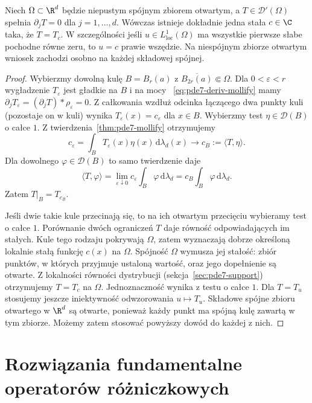 \begin{wniosek}
Niech $\Omega\subset\R^d$ będzie niepustym spójnym
zbiorem otwartym, a $T\in\mathcal D'(\Omega)$
spełnia $\partial_jT=0$ dla $j=1,\ldots,d$.
Wówczas istnieje dokładnie jedna stała $c\in\C$
taka, że $T=T_c$.
W szczególności jeśli $u\in L^1_{\mathrm{loc}}(\Omega)$
ma wszystkie pierwsze słabe pochodne równe zeru,
to $u=c$ prawie wszędzie.
Na niespójnym zbiorze otwartym wniosek zachodzi
osobno na każdej składowej spójnej.
\end{wniosek}
\begin{proof}
Wybierzmy dowolną kulę $B=B_r(a)$ z
$\overline{B_{2r}(a)}\Subset\Omega$.
Dla $0<\varepsilon<r$ wygładzenie $T_\varepsilon$
jest gładkie na $B$ i na mocy
~\eqref{eq:pde7-deriv-mollify} mamy
$\partial_jT_\varepsilon=(\partial_jT)*\rho_\varepsilon=0$.
Z całkowania wzdłuż odcinka łączącego dwa
punkty kuli (pozostaje on w kuli) wynika
$T_\varepsilon(x)=c_\varepsilon$ dla $x\in B$.
Wybierzmy test $\eta\in\mathcal D(B)$
o całce $1$. Z twierdzenia~\ref{thm:pde7-mollify}
otrzymujemy
\[
 c_\varepsilon=\int_B T_\varepsilon(x)\eta(x)\,
 \mathrm d\lambda_d(x)\longrightarrow
 c_B:=\langle T,\eta\rangle.
\]
Dla dowolnego $\varphi\in\mathcal D(B)$ to samo
twierdzenie daje
\[
 \langle T,\varphi\rangle
 =\lim_{\varepsilon\downarrow0}
 c_\varepsilon\int_B\varphi\,\mathrm d\lambda_d
 =c_B\int_B\varphi\,\mathrm d\lambda_d.
\]
Zatem $T|_B=T_{c_B}$.

Jeśli dwie takie kule przecinają się, to na ich
otwartym przecięciu wybieramy test o całce $1$.
Porównanie dwóch ograniczeń $T$ daje równość
odpowiadających im stałych. Kule tego rodzaju
pokrywają $\Omega$, zatem wyznaczają dobrze
określoną lokalnie stałą funkcję $c(x)$ na $\Omega$.
Spójność $\Omega$ wymusza jej stałość: zbiór punktów,
w których przyjmuje ustaloną wartość, oraz jego
dopełnienie są otwarte. Z lokalności równości
dystrybucji (sekcja~\ref{sec:pde7-support})
otrzymujemy $T=T_c$ na $\Omega$.
Jednoznaczność wynika z testu o całce $1$.
Dla $T=T_u$ stosujemy jeszcze iniektywność
odwzorowania $u\mapsto T_u$.
Składowe spójne zbioru otwartego w $\R^d$
są otwarte, ponieważ każdy punkt ma spójną kulę
zawartą w tym zbiorze. Możemy zatem stosować
powyższy dowód do każdej z nich.
\end{proof}

\section{Rozwiązania fundamentalne operatorów różniczkowych}
\label{sec:pde7-fundamental}

